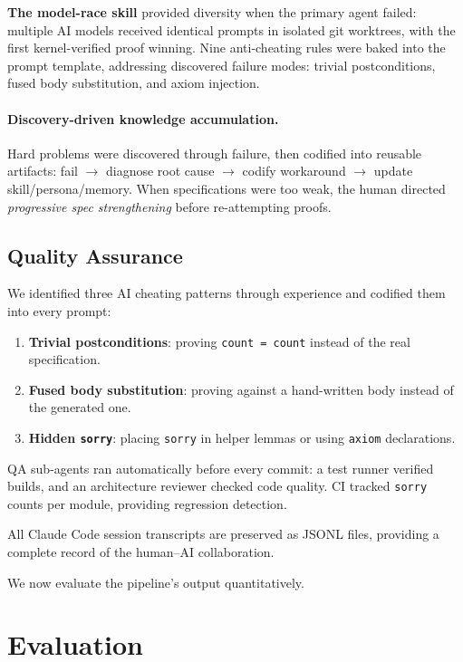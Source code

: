 \documentclass[sigconf,nonacm,screen]{acmart}
\begin{document}
\textbf{The model-race skill} provided diversity when the primary agent
failed: multiple AI models received identical prompts in isolated git
worktrees, with the first kernel-verified proof winning. Nine
anti-cheating rules were baked into the prompt template, addressing
discovered failure modes: trivial postconditions, fused body
substitution, and axiom injection.

\paragraph{Discovery-driven knowledge accumulation.}
Hard problems were discovered through failure, then codified into
reusable artifacts: fail $\to$ diagnose root cause $\to$ codify
workaround $\to$ update skill/persona/memory. When specifications
were too weak, the human directed \emph{progressive spec strengthening}
before re-attempting proofs.

\subsection{Quality Assurance}

We identified three AI cheating patterns through experience and
codified them into every prompt:

\begin{enumerate}
\item \textbf{Trivial postconditions}: proving \texttt{count = count}
  instead of the real specification.
\item \textbf{Fused body substitution}: proving against a hand-written
  body instead of the generated one.
\item \textbf{Hidden \texttt{sorry}}: placing \texttt{sorry} in helper lemmas
  or using \texttt{axiom} declarations.
\end{enumerate}

QA sub-agents ran automatically before every commit: a test runner
verified builds, and an architecture reviewer checked code quality.
CI tracked \texttt{sorry} counts per module, providing regression detection.

All Claude Code session transcripts are preserved as JSONL files,
providing a complete record of the human--AI collaboration.


We now evaluate the pipeline's output quantitatively.

\section{Evaluation}
\end{document}
